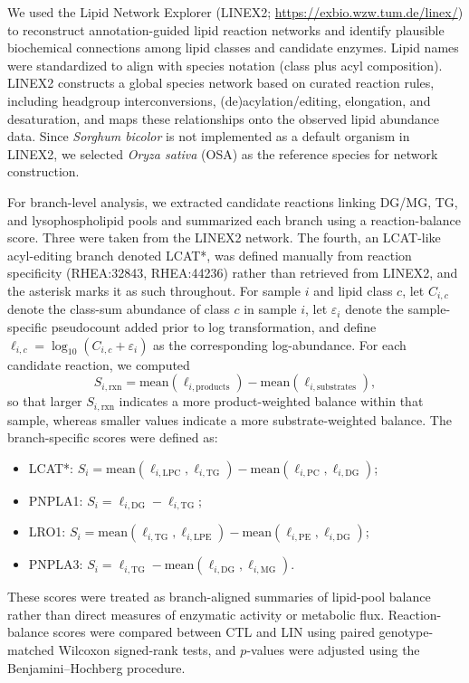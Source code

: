 \documentclass[9pt,twocolumn,twoside]{rilabRxiv}
\begin{document}
We used the Lipid Network Explorer (LINEX2; \url{https://exbio.wzw.tum.de/linex/}) to reconstruct annotation-guided lipid reaction networks and identify plausible biochemical connections among lipid classes and candidate enzymes. Lipid names were standardized to align with species notation (class plus acyl composition). LINEX2 constructs a global species network based on curated reaction rules, including headgroup interconversions, (de)acylation/editing, elongation, and desaturation, and maps these relationships onto the observed lipid abundance data. Since \textit{Sorghum bicolor} is not implemented as a default organism in LINEX2, we selected \textit{Oryza sativa} (OSA) as the reference species for network construction.

For branch-level analysis, we extracted candidate reactions linking DG/MG, TG, and lysophospholipid pools and summarized each branch using a reaction-balance score. Three were taken from the LINEX2 network. The fourth, an LCAT-like acyl-editing branch denoted LCAT*, was defined manually from reaction specificity (RHEA:32843, RHEA:44236) rather than retrieved from LINEX2, and the asterisk marks it as such throughout. For sample $i$ and lipid class $c$, let $C_{i,c}$ denote the class-sum abundance of class $c$ in sample $i$, let $\varepsilon_i$ denote the sample-specific pseudocount added prior to log transformation, and define $\ell_{i,c}=\log_{10}(C_{i,c}+\varepsilon_i)$ as the corresponding log-abundance. For each candidate reaction, we computed
\[
S_{i,\mathrm{rxn}}=\mathrm{mean}(\ell_{i,\mathrm{products}})-\mathrm{mean}(\ell_{i,\mathrm{substrates}}),
\]
so that larger $S_{i,\mathrm{rxn}}$ indicates a more product-weighted balance within that sample, whereas smaller values indicate a more substrate-weighted balance. The branch-specific scores were defined as:
\begin{itemize}
\item LCAT*: $S_i=\mathrm{mean}(\ell_{i,\mathrm{LPC}},\ell_{i,\mathrm{TG}})-\mathrm{mean}(\ell_{i,\mathrm{PC}},\ell_{i,\mathrm{DG}})$;
\item PNPLA1: $S_i=\ell_{i,\mathrm{DG}}-\ell_{i,\mathrm{TG}}$;
\item LRO1: $S_i=\mathrm{mean}(\ell_{i,\mathrm{TG}},\ell_{i,\mathrm{LPE}})-\mathrm{mean}(\ell_{i,\mathrm{PE}},\ell_{i,\mathrm{DG}})$;
\item PNPLA3: $S_i=\ell_{i,\mathrm{TG}}-\mathrm{mean}(\ell_{i,\mathrm{DG}},\ell_{i,\mathrm{MG}})$.
\end{itemize}
These scores were treated as branch-aligned summaries of lipid-pool balance rather than direct measures of enzymatic activity or metabolic flux. Reaction-balance scores were compared between CTL and LIN using paired genotype-matched Wilcoxon signed-rank tests, and $p$-values were adjusted using the Benjamini--Hochberg procedure.
\end{document}
